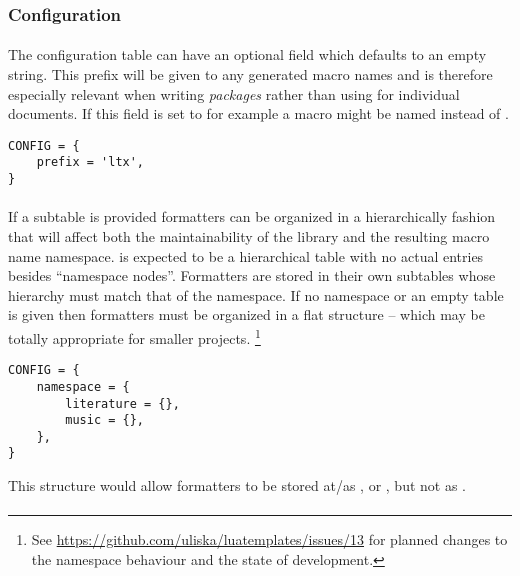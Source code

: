 \documentclass{scrartcl}
\begin{document}
\subsubsection{Configuration}
\label{sec:config-table-configuration}

\paragraph{}

The configuration table can have an optional field  which
defaults to an empty string.  This prefix will be given to any generated macro
names and is therefore especially relevant when writing \emph{packages} rather
than using  for individual documents.  If this field is set
to  for example a macro might be named 
instead of .

\begin{verbatim}
CONFIG = {
    prefix = 'ltx',
}
\end{verbatim}


\paragraph{}

If a  subtable is provided formatters can be organized in a
hierarchically fashion that will affect both the maintainability of the library
and the resulting macro name namespace.  is expected to be a
hierarchical table with no actual entries besides “namespace nodes”.  Formatters
are stored in their own subtables whose hierarchy must match that of the
namespace.  If no namespace or an empty table is given then formatters must be
organized in a flat structure -- which may be totally appropriate for smaller
projects.%
\footnote{See \url{https://github.com/uliska/luatemplates/issues/13} for planned
changes to the namespace behaviour and the state of development.} %

\begin{verbatim}
CONFIG = {
    namespace = {
        literature = {},
        music = {},
    },
}
\end{verbatim}

\noindent
This structure would allow formatters to be stored at/as ,
 or , but not as
.


\paragraph{}
\end{document}
